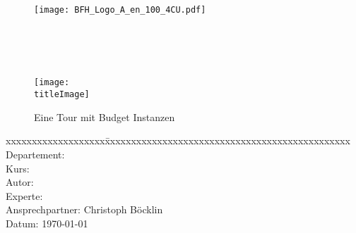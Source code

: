 \thispagestyle{empty}

\begin{figure}
	\texttt{[image: BFH\_Logo\_A\_en\_100\_4CU.pdf]}
\end{figure}


\begin{minipage}[c][3cm][c]{\linewidth} {
	\centering
	\vspace*{2cm}
	{\fontsize{24pt}{0pt}\selectfont \textbf{\doctitle}}  \\
	\vspace*{0.6cm}
	{\fontsize{20pt}{0pt}\selectfont {Geodatenverarbeitung\\ mit Budget Instanzen}}  \\
	\vspace*{1cm}
	{\fontsize{14pt}{0pt}\selectfont \doctype}  \\
}
\end{minipage}


\vspace{1.5cm}


\begin{figure}[H]
	\centering
	\makebox[0.9\linewidth]{\color{BFHGray} \rule{0.9\linewidth}{10pt}}
	\texttt{[image: \\titleImage]}
	\makebox[0.9\linewidth]{\color{BFHGray} \rule{0.9\linewidth}{10pt}}
    \caption{Eine Tour mit Budget Instanzen\space\cite{HippieCar:1}}
\end{figure}

\vfill

\begin{minipage}[c][3cm][c]{\linewidth}
{
	\centering
	\begin{tabbing}
		xxxxxxxxxxxxxxxxxxx\=xxxxxxxxxxxxxxxxxxxxxxxxxxxxxxxxxxxxxxxxxxxxxxx \kill
		Departement:	\> \fieldofstudies \\
		Kurs:			\> \course \\
		Autor:		\> \docauthor \\%
		Experte:		\> \prof \\
		Ansprechpartner:      \> Christoph Böcklin \\
		Datum:			\> \today \\
	\end{tabbing}
}
\end{minipage}

\pagebreak
